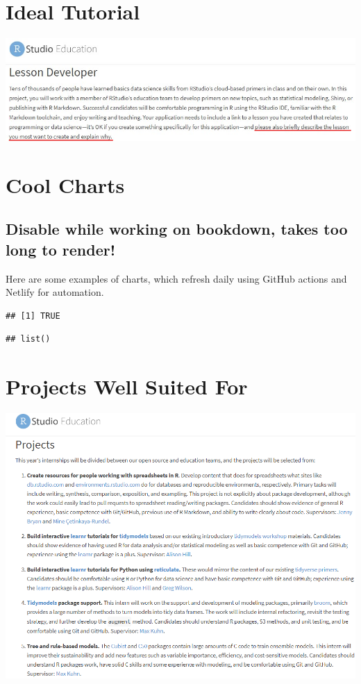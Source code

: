 \documentclass[
]{book}
\begin{document}
\hypertarget{ideal-tutorial}{%
\chapter{Ideal Tutorial}\label{ideal-tutorial}}

\includegraphics{images/idealTutorial.png}

\hypertarget{cool-charts}{%
\chapter{Cool Charts}\label{cool-charts}}

\hypertarget{disable-while-working-on-bookdown-takes-too-long-to-render}{%
\section{Disable while working on bookdown, takes too long to render!}\label{disable-while-working-on-bookdown-takes-too-long-to-render}}

Here are some examples of charts, which refresh daily using GitHub actions and Netlify for automation.

\begin{verbatim}
## [1] TRUE
\end{verbatim}

\begin{verbatim}
## list()
\end{verbatim}

\hypertarget{projects-well-suited-for}{%
\chapter{Projects Well Suited For}\label{projects-well-suited-for}}

\includegraphics{images/projects_list.png}
\end{document}
